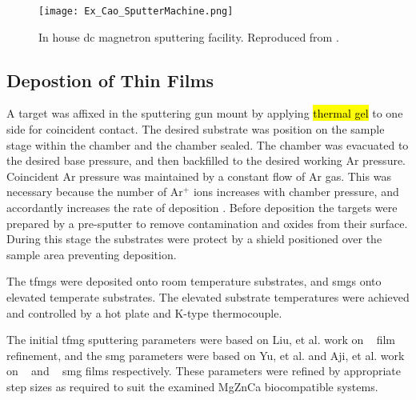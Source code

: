 \documentclass[a4paper,12pt,oneside]{report}%
\begin{document}
\begin{figure}[htbp]
	\centering
	\texttt{[image: Ex\_Cao\_SputterMachine.png]}
	\caption[In house \acrshort{dc} magnetron sputtering facility.]{In house \acrshort{dc} magnetron sputtering facility. Reproduced from \cite{Cao2013}.}
	\label{fig:CaoSputtering}
\end{figure}

\subsection{Depostion of Thin Films}
A target was affixed in the sputtering gun mount by applying \hl{thermal gel} to one side for coincident contact. The desired substrate was position on the sample stage within the chamber and the chamber sealed. The chamber was evacuated to the desired base pressure, and then backfilled to the desired working Ar pressure. Coincident Ar pressure was maintained by a constant flow of Ar gas. This was necessary because the number of Ar$^{+}$ ions increases with chamber pressure, and accordantly increases the rate of deposition \cite{Ozeki2002}. Before deposition the targets were prepared by a pre-sputter to remove contamination and oxides from their surface. During this stage the substrates were protect by a shield positioned over the sample area preventing deposition.

The \glspl{tfmg} were deposited onto room temperature substrates, and \glspl{smg} onto elevated temperate substrates. The elevated substrate temperatures were achieved and controlled by a hot plate and K-type thermocouple.

The initial \gls{tfmg} sputtering parameters were based on Liu, et al. \cite{Liu2012} work on \ZrCuNiAl~ film refinement, and the \gls{smg} parameters were based on Yu, et al. \cite{Yu2013} and Aji, et al. \cite{Aji2013} work on \ZrCuAl~ and \ZrCuNiAl~ \gls{smg} films respectively. These parameters were refined by appropriate step sizes as required to suit the examined MgZnCa biocompatible systems. 
\end{document}
